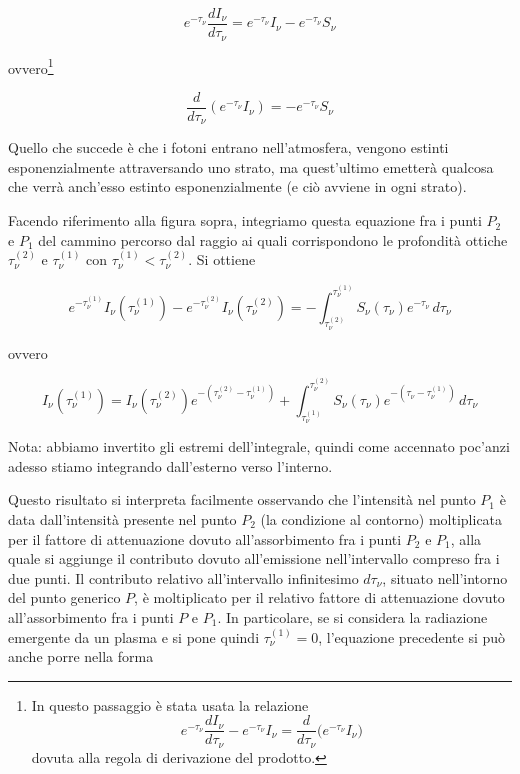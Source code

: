 $$e^{-\tau_{\nu}} \frac{dI_{\nu}}{d \tau_{\nu}}
=e^{-\tau_{\nu}} I_{\nu} - e^{-\tau_{\nu}} S_{\nu}$$

ovvero\footnote{In questo passaggio è stata usata la relazione
$$e^{-\tau_\nu}\frac{dI_{\nu}}{d\tau_{\nu}} - e^{-\tau_\nu}I_{\nu}=\frac{d}{d \tau_{\nu}} \big( e^{-\tau_\nu} I_{\nu} \big)$$
dovuta alla regola di derivazione del prodotto.}

\begin{equation}
  \frac{d}{d \tau_{\nu}} \left( e^{-\tau_{\nu}}I_{\nu} \right)=-e^{-\tau_{\nu}} S_{\nu}
\end{equation}

Quello che succede è che i fotoni entrano nell'atmosfera, vengono estinti esponenzialmente attraversando uno strato, ma quest'ultimo emetterà qualcosa che verrà anch'esso estinto esponenzialmente (e ciò avviene in ogni strato).

Facendo riferimento alla figura sopra, integriamo questa equazione fra i punti $P_2$ e $P_1$ del cammino percorso dal raggio ai quali corrispondono le profondità ottiche $\tau_{\nu}^{(2)}$ e $\tau_{\nu}^{(1)}$ con $\tau_{\nu}^{(1)}<\tau_{\nu}^{(2)}$. Si ottiene

$$e^{-\tau_{\nu}^{(1)}} I_{\nu} \left( \tau_{\nu}^{(1)} \right) - e^{-\tau_{\nu}^{(2)}} I_{\nu} \left( \tau_{\nu}^{(2)} \right)
=-\int_{\tau_{\nu}^{(2)}}^{\tau_{\nu}^{(1)}} S_{\nu}(\tau_{\nu}) e^{-\tau_{\nu}} \, d\tau_{\nu}$$

ovvero

$$I_{\nu} \left( \tau_{\nu}^{(1)} \right)
=I_{\nu} \left( \tau_{\nu}^{(2)} \right) e^{-\left( \tau_{\nu}^{(2)} - \tau_{\nu}^{(1)} \right)} + \int_{\tau_{\nu}^{(1)}}^{\tau_{\nu}^{(2)}} S_{\nu}(\tau_{\nu}) e^{- \left( \tau_{\nu} - \tau_{\nu}^{(1)} \right) } \, d\tau_{\nu}$$

Nota: abbiamo invertito gli estremi dell'integrale, quindi come accennato poc'anzi adesso stiamo integrando dall'esterno verso l'interno.

Questo risultato si interpreta facilmente osservando che l'intensità nel punto $P_1$ è data dall'intensità presente nel punto $P_2$ (la condizione al contorno) moltiplicata per il fattore di attenuazione dovuto all'assorbimento fra i punti $P_2$ e $P_1$, alla quale si aggiunge il contributo dovuto all'emissione nell'intervallo compreso fra i due punti. Il contributo relativo all'intervallo infinitesimo $d\tau_{\nu}$, situato nell'intorno del punto generico $P$, è moltiplicato per il relativo fattore di attenuazione dovuto all'assorbimento fra i punti $P$ e $P_1$. In particolare, se si considera la radiazione emergente da un plasma e si pone quindi $\tau_{\nu}^{(1)}=0$, l'equazione precedente si può anche porre nella forma

